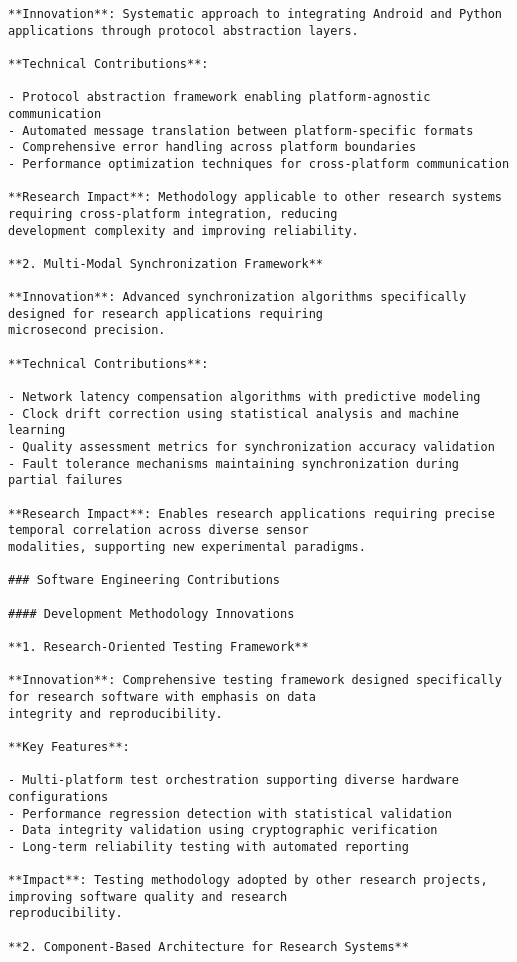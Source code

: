 \documentclass[11pt,a4paper]{report}
\begin{document}
\begin{verbatim}
**Innovation**: Systematic approach to integrating Android and Python applications through protocol abstraction layers.

**Technical Contributions**:

- Protocol abstraction framework enabling platform-agnostic communication
- Automated message translation between platform-specific formats
- Comprehensive error handling across platform boundaries
- Performance optimization techniques for cross-platform communication

**Research Impact**: Methodology applicable to other research systems requiring cross-platform integration, reducing
development complexity and improving reliability.

**2. Multi-Modal Synchronization Framework**

**Innovation**: Advanced synchronization algorithms specifically designed for research applications requiring
microsecond precision.

**Technical Contributions**:

- Network latency compensation algorithms with predictive modeling
- Clock drift correction using statistical analysis and machine learning
- Quality assessment metrics for synchronization accuracy validation
- Fault tolerance mechanisms maintaining synchronization during partial failures

**Research Impact**: Enables research applications requiring precise temporal correlation across diverse sensor
modalities, supporting new experimental paradigms.

### Software Engineering Contributions

#### Development Methodology Innovations

**1. Research-Oriented Testing Framework**

**Innovation**: Comprehensive testing framework designed specifically for research software with emphasis on data
integrity and reproducibility.

**Key Features**:

- Multi-platform test orchestration supporting diverse hardware configurations
- Performance regression detection with statistical validation
- Data integrity validation using cryptographic verification
- Long-term reliability testing with automated reporting

**Impact**: Testing methodology adopted by other research projects, improving software quality and research
reproducibility.

**2. Component-Based Architecture for Research Systems**


\end{verbatim}
\end{document}
